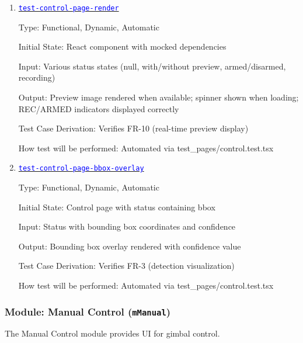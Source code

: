 \documentclass[12pt, titlepage]{article}
\newcommand{\mref}[1]{\texttt{#1}}
\newcommand{\tid}[1]{\hyperlink{tid:#1}{\textcolor{blue}{\texttt{#1}}}}
\begin{document}
\begin{enumerate}

  \item{\tid{test-control-page-render}\\}

        Type: Functional, Dynamic, Automatic

        Initial State: React component with mocked dependencies

        Input: Various status states (null, with/without preview, armed/disarmed,
        recording)

        Output: Preview image rendered when available; spinner shown when loading;
        REC/ARMED indicators displayed correctly

        Test Case Derivation: Verifies FR-10 (real-time preview display)

        How test will be performed: Automated via test\_pages/control.test.tsx

  \item{\tid{test-control-page-bbox-overlay}\\}

        Type: Functional, Dynamic, Automatic

        Initial State: Control page with status containing bbox

        Input: Status with bounding box coordinates and confidence

        Output: Bounding box overlay rendered with confidence value

        Test Case Derivation: Verifies FR-3 (detection visualization)

        How test will be performed: Automated via test\_pages/control.test.tsx

\end{enumerate}

\subsubsection{Module: Manual Control (\mref{mManual})}

The Manual Control module provides UI for gimbal control.
\end{document}
